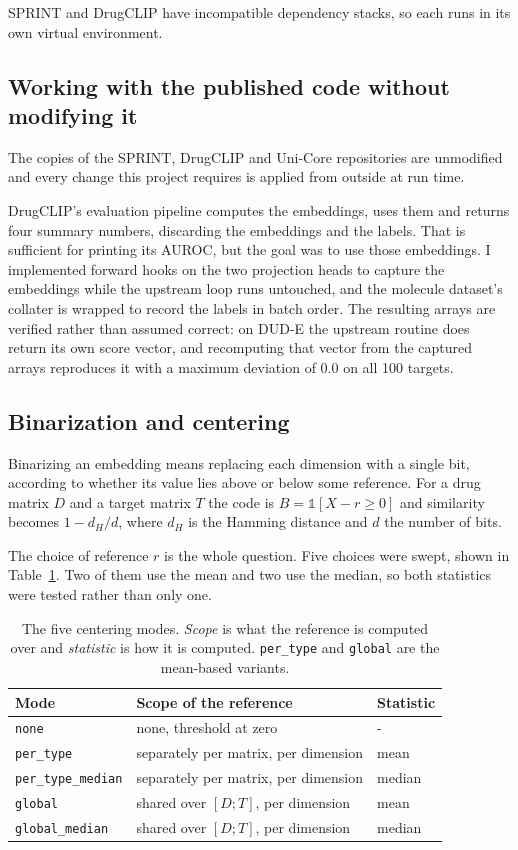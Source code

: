 \documentclass[10pt,a4paper]{article}
\begin{document}
SPRINT and DrugCLIP have incompatible dependency stacks, so each runs in its own virtual
environment.

\subsection{Working with the published code without modifying it}
The copies of the SPRINT, DrugCLIP and Uni-Core repositories are unmodified and every change
this project requires is applied from outside at run time.

DrugCLIP's evaluation pipeline computes the embeddings, uses them and returns four summary
numbers, discarding the embeddings and the labels. That is sufficient for printing its AUROC,
but the goal was to use those embeddings. I implemented forward hooks on the two projection
heads to capture the embeddings while the upstream loop runs untouched, and the molecule
dataset's collater is wrapped to record the labels in batch order. The resulting arrays are
verified rather than assumed correct: on DUD-E the upstream routine does return its own score
vector, and recomputing that vector from the captured arrays reproduces it with a maximum
deviation of 0.0 on all 100 targets.

\subsection{Binarization and centering}
Binarizing an embedding means replacing each dimension with a single bit, according to whether
its value lies above or below some reference. For a drug matrix $D$ and a target matrix $T$
the code is $B = \mathbb{1}[X - r \geq 0]$ and similarity becomes $1 - d_H/d$, where $d_H$ is
the Hamming distance and $d$ the number of bits.

The choice of reference $r$ is the whole question. Five choices were swept, shown in Table~\ref{tab:modes}.
Two of them use the mean and two use the median, so both statistics were tested rather than
only one.

\begin{table}[h]
\centering
\small
\caption{\label{tab:modes}The five centering modes. \emph{Scope} is what the reference is computed over and
\emph{statistic} is how it is computed. \texttt{per\_type} and \texttt{global} are the
mean-based variants.}
\begin{tabular}{lll}
\toprule
Mode & Scope of the reference & Statistic \\
\midrule
\texttt{none} & none, threshold at zero & - \\
\texttt{per\_type} & separately per matrix, per dimension & mean \\
\texttt{per\_type\_median} & separately per matrix, per dimension & median \\
\texttt{global} & shared over $[D;T]$, per dimension & mean \\
\texttt{global\_median} & shared over $[D;T]$, per dimension & median \\
\bottomrule
\end{tabular}
\end{table}
\end{document}
